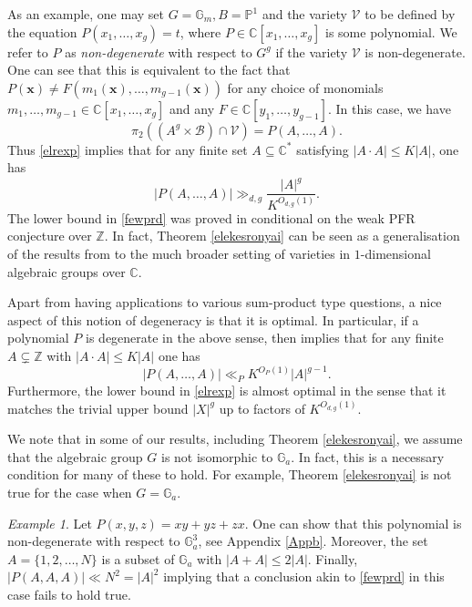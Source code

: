 \documentclass[12pt, reqno]{amsart}
\newcommand{\G}{\mathbb{G}}
\renewcommand{\vec}[1]{\mathbf{#1}}
\renewcommand{\vec}{\bm}
\theoremstyle{remark}
\newtheorem{example}[theorem]{Example}
\theoremstyle{definition}
\numberwithin{equation}{section}
\begin{document}
As an example, one may set $G = \mathbb{G}_m, B = \mathbb{P}^1$ and the variety $\mathcal{V}$ to be defined by the equation $P(x_1, \dots, x_g) = t$, where $P \in \mathbb{C}[x_1, \dots, x_g]$ is some polynomial. We refer to $P$ as \emph{non-degenerate} with respect to $G^g$ if the variety $\mathcal{V}$ is non-degenerate. One can see that this is equivalent to the fact that $P(\vec{x}) \neq F(m_1(\vec{x}), \dots, m_{g-1}(\vec{x}))$ for any choice of monomials $m_1, \dots, m_{g-1} \in \mathbb{C}[x_1, \dots, x_g]$ and any $F \in \mathbb{C}[y_1, \dots, y_{g-1}]$. In this case, we have
\[ \pi_2((A^g\times \mathcal{B}) \cap \mathcal{V}) = P(A,\dots, A) . \] 
Thus \eqref{elrexp} implies that for any finite set $A \subseteq \mathbb{C}^{*}$ satisfying $|A \cdot A| \leq K|A|$, one has
\begin{equation}  \label{fewprd}
|P(A,\dots, A)| \gg_{d,g} \frac{|A|^g}{K^{O_{d,g}(1)}}. 
\end{equation}
The lower bound in \eqref{fewprd} was proved in \cite{Mu2024a} conditional on the weak PFR conjecture over $\mathbb{Z}$. In fact, Theorem \ref{elekesronyai} can be seen as a generalisation of the results from \cite{Mu2024a} to the much broader setting of varieties in $1$-dimensional algebraic groups over $\mathbb{C}$.

Apart from having applications to various sum-product type questions, a nice aspect of this notion of degeneracy is that it is optimal. In particular, if a polynomial $P$ is degenerate in the above sense, then \cite[Proposition 1.2]{Mu2024a} implies that for any finite $A \subsetneq \mathbb{Z}$ with $|A \cdot A| \leq K |A|$ one has 
\[ |P(A, \dots, A)| \ll_P K^{O_P(1)}|A|^{g-1} .\]
Furthermore, the lower bound in \eqref{elrexp} is almost optimal in the sense that it matches the trivial upper bound $|X|^g$ up to factors of $K^{O_{d,g}(1)}$.

We note that in some of our results, including Theorem \ref{elekesronyai}, we assume that the algebraic group $G$ is not isomorphic to $\G_a$. In fact, this is a necessary condition for many of these to hold. For example, Theorem \ref{elekesronyai} is not true for the case when $G = \G_a$. 

\begin{example}
    Let $P(x,y,z) = xy + yz + zx$. One can show that this polynomial is non-degenerate with respect to $\G_a^3$, see Appendix \ref{Appb}. Moreover, the set $A = \{1,2,\dots, N\}$ is a subset of $\G_a$ with $|A+A| \leq 2|A|$. Finally, $|P(A,A,A)| \ll N^2 = |A|^2$ implying that a conclusion akin to \eqref{fewprd} in this case fails to hold true. 
\end{example}
\end{document}
